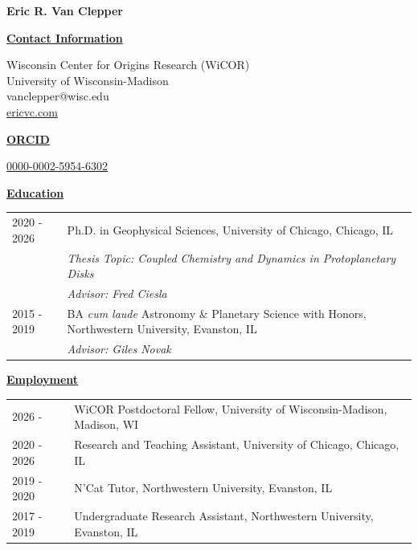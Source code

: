 \documentclass[11pt]{article}
\newcommand{\link}[1]{{\color{blue}\href{#1}{#1}}}
\begin{document}
\begin{center}
    \textbf{Eric R. Van Clepper}
\end{center}

\noindent\textbf{\underline{Contact Information}}

\noindent
Wisconsin Center for Origins Research (WiCOR) \\
University of Wisconsin-Madison \\
vanclepper@wisc.edu \\
\link{ericvc.com}

\vspace{1em}
\noindent\textbf{\underline{ORCID}}

\noindent
{\color{blue}\href{https://orcid.org/0000-0002-5954-6302}{0000-0002-5954-6302}}

\vspace{1em}
\noindent\textbf{\underline{Education}}

\noindent
\begin{tabular}{p{0.8in} p{5.2in}}
    2020 - 2026 & Ph.D. in Geophysical Sciences, University of Chicago,
    Chicago, IL  \\
     &  \emph{Thesis Topic: Coupled Chemistry and Dynamics in Protoplanetary Disks} \\
     &  \emph{Advisor: Fred Ciesla} \\
    2015 - 2019 & BA \textit{cum laude} Astronomy \& Planetary Science with Honors,
    Northwestern University, Evanston, IL \\
     & \emph{Advisor: Giles Novak}
\end{tabular}

\vspace{1em}
\noindent\textbf{\underline{Employment}}

\noindent
\begin{tabular}{p{0.8in} p{5.2in}}
    2026 -      & WiCOR Postdoctoral Fellow, University of Wisconsin-Madison,
    Madison, WI \\
    2020 - 2026 & Research and Teaching Assistant, University of Chicago, Chicago, IL
    \\
    2019 - 2020 & N'Cat Tutor, Northwestern University, Evanston, IL \\
    2017 - 2019 & Undergraduate Research Assistant, Northwestern University,
    Evanston, IL \\
\end{tabular}
\end{document}
